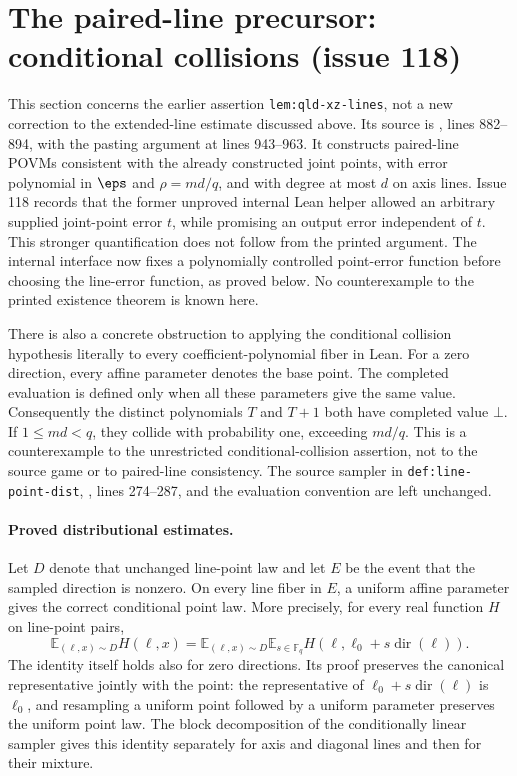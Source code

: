 \documentclass[11pt]{article}
\begin{document}
\section{The paired-line precursor: conditional collisions (issue 118)}

This section concerns the earlier assertion \texttt{lem:qld-xz-lines}, not a
new correction to the extended-line estimate discussed above. Its source is
,
lines 882--894, with the pasting argument at lines 943--963. It constructs
paired-line POVMs consistent with the already constructed joint points, with
error polynomial in $\eps$ and $\rho=md/q$, and with degree at most $d$ on
axis lines. Issue 118 records that the former unproved internal Lean helper
allowed an arbitrary supplied joint-point error $t$, while promising an
output error independent of $t$. This stronger quantification does not
follow from the printed argument. The internal interface now fixes a
polynomially controlled point-error function before choosing the line-error
function, as proved below. No counterexample to the printed existence
theorem is known here.

There is also a concrete obstruction to applying the conditional collision
hypothesis literally to every coefficient-polynomial fiber in Lean. For a
zero direction, every affine parameter denotes the base point. The completed
evaluation is defined only when all these parameters give the same value.
Consequently the distinct polynomials $T$ and $T+1$ both have completed value
$\bot$. If $1\le md<q$, they collide with probability one, exceeding $md/q$.
This is a counterexample to the unrestricted conditional-collision assertion,
not to the source game or to paired-line consistency. The source sampler in
\texttt{def:line-point-dist},
,
lines 274--287, and the evaluation convention are left unchanged.

\paragraph{Proved distributional estimates.}
Let $D$ denote that unchanged line-point law and let $E$ be the event that
the sampled direction is nonzero. On every line fiber in $E$, a uniform
affine parameter gives the correct conditional point law. More precisely,
for every real function $H$ on line-point pairs,
\[
 \mathbb E_{(\ell,x)\sim D}H(\ell,x)
 =\mathbb E_{(\ell,x)\sim D}\mathbb E_{s\in\mathbb F_q}
     H(\ell,\ell_0+s\operatorname{dir}(\ell)).
\]
The identity itself holds also for zero directions. Its proof preserves the
canonical representative jointly with the point: the representative of
$\ell_0+s\operatorname{dir}(\ell)$ is $\ell_0$, and resampling a uniform
point followed by a uniform parameter preserves the uniform point law.
The block decomposition of the conditionally linear sampler gives this
identity separately for axis and diagonal lines and then for their mixture.
\end{document}
